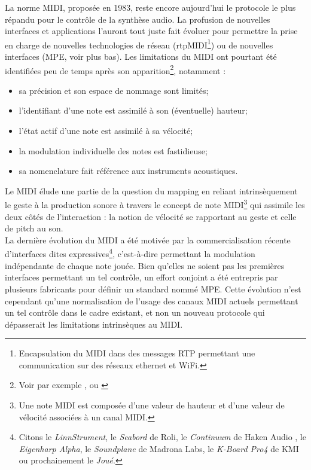 \noindent La norme \gls{MIDI}, proposée en 1983, reste encore aujourd'hui le protocole le plus répandu pour le contrôle de la synthèse audio. La profusion de nouvelles interfaces et applications l'auront tout juste fait évoluer pour permettre la prise en charge de nouvelles technologies de réseau (rtpMIDI\footnote{ Encapsulation du \gls{MIDI} dans des messages \gls{RTP} permettant une communication sur des réseaux ethernet et WiFi.}) ou de nouvelles interfaces (\gls{MPE}, voir plus bas).
Les limitations du \gls{MIDI} ont pourtant été identifiées peu de temps après son apparition\footnote{Voir par exemple \cite{moore_dysfunctions_1988}, \cite{mcmillen_zipi_1994} ou \cite{selfridge-field_beyond_1997}}, notamment :
\vspace{-1em}
\begin{itemize}[noitemsep]
	\item sa précision et son espace de nommage sont limités;
	\item l'identifiant d'une note est assimilé à son (éventuelle) hauteur;
	\item l'état actif d'une note est assimilé à sa vélocité;
	\item la modulation individuelle des notes est fastidieuse;
	\item sa nomenclature fait référence aux instruments acoustiques.
\end{itemize}

\noindent Le \gls{MIDI} élude une partie de la question du mapping en reliant intrinsèquement le geste à la production sonore à travers le concept de note \gls{MIDI}\footnote{Une note \gls{MIDI} est composée d'une valeur de hauteur et d'une valeur de vélocité associées à un canal \gls{MIDI}.} qui assimile les deux côtés de l'interaction : la notion de vélocité se rapportant au geste et celle de pitch au son.\\
\indent La dernière évolution du \gls{MIDI} a été motivée par la commercialisation récente d'interfaces dites expressives\footnote{Citons le \textit{LinnStrument}, le \textit{Seabord} de Roli, le \textit{Continuum} de Haken Audio , le \textit{Eigenharp Alpha}, le \textit{Soundplane} de Madrona Labs, le \textit{K-Board Pro4} de KMI ou prochainement le \textit{Joué}.}, c'est-à-dire permettant la modulation indépendante de chaque note jouée. Bien qu'elles ne soient pas les premières interfaces permettant un tel contrôle, un effort conjoint a été entrepris par plusieurs fabricants pour définir un standard nommé \gls{MPE}. Cette évolution n'est cependant qu'une normalisation de l'usage des canaux \gls{MIDI} actuels permettant un tel contrôle dans le cadre existant, et non un nouveau protocole qui dépasserait les limitations intrinsèques au \gls{MIDI}.


